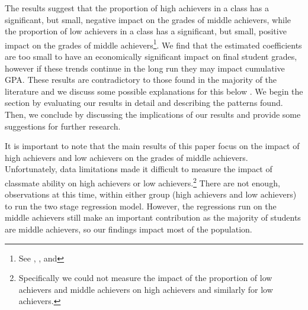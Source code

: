 The results suggest that the proportion of high achievers in a class has a significant, but small, negative impact on the grades of middle achievers, while the proportion of low achievers in a class has a significant, but small, positive impact on the grades of middle achievers\footnote{See , , and }.
We find that the estimated coefficients are too small to have an economically significant impact on final student grades, however if these trends continue in the long run they may impact cumulative GPA. 
These results are contradictory to those found in the majority of the literature and we discuss some possible explanations for this below \citep{kang2007classroom,carman2012classroom,burke2013classroom,schlosser2008inside,lavy2012good}. 
We begin the section by evaluating our results in detail and describing the patterns found.
Then, we conclude by discussing the implications of our results and provide some suggestions for further research. 


It is important to note that the main results of this paper focus on the impact of high achievers and low achievers on the grades of middle achievers. 
Unfortunately, data limitations made it difficult to measure the impact of classmate ability on high achievers or low achievers.\footnote{Specifically we could not measure the impact of the proportion of low achievers and middle achievers on high achievers and similarly for low achievers.} 
There are not enough, observations at this time, within either group (high achievers and low achievers) to run the two stage regression model. 
However, the regressions run on the middle achievers still make an important contribution as the majority of students are middle achievers, so our findings impact most of the population.

